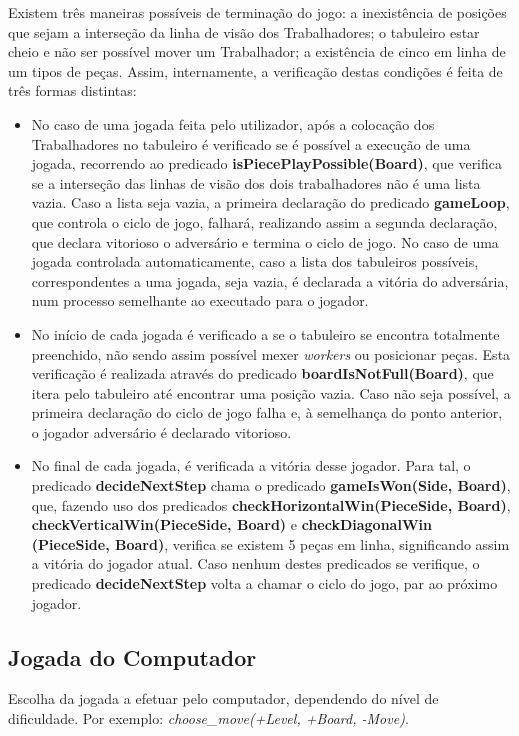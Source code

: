\documentclass[a4paper]{article}
\begin{document}
Existem três maneiras possíveis de terminação do jogo: a inexistência  de posições que sejam a interseção da linha de visão dos Trabalhadores; o tabuleiro estar cheio e não ser possível mover um Trabalhador; a existência de cinco em linha de um tipos de peças.
Assim, internamente, a verificação destas condições é feita de três formas distintas:
\begin{itemize}
	\item No caso de uma jogada feita pelo utilizador, após a colocação dos Trabalhadores no tabuleiro é verificado se é possível a execução de uma jogada, recorrendo ao predicado \textbf{isPiecePlayPossible(Board)}, que verifica se a interseção das linhas de visão dos dois trabalhadores não é uma lista vazia. Caso a lista seja vazia, a primeira declaração do predicado \textbf{gameLoop}, que controla o ciclo de jogo, falhará, realizando assim a segunda declaração, que declara vitorioso o adversário e termina o ciclo de jogo. No caso de uma jogada controlada automaticamente, caso a lista dos tabuleiros possíveis, correspondentes a uma jogada, seja vazia, é declarada a vitória do adversária, num processo semelhante ao executado para o jogador.
	\item No início de cada jogada é verificado a se o tabuleiro se encontra totalmente preenchido, não sendo assim possível mexer \textit{workers} ou posicionar peças. Esta verificação é realizada através do predicado \textbf{boardIsNotFull(Board)}, que itera pelo tabuleiro até encontrar uma posição vazia. Caso não seja possível, a primeira declaração do ciclo de jogo falha e, à semelhança do ponto anterior, o jogador adversário é declarado vitorioso.
	\item No final de cada jogada, é verificada a vitória desse jogador. Para tal, o predicado \textbf{decideNextStep} chama o predicado \textbf{gameIsWon(Side, Board)}, que, fazendo uso dos predicados \textbf{checkHorizontalWin(PieceSide, Board)}, \textbf{checkVerticalWin(PieceSide, Board)} e \textbf{checkDiagonalWin (PieceSide, Board)}, verifica se existem 5 peças em linha, significando assim a vitória do jogador atual. Caso nenhum destes predicados se verifique, o predicado \textbf{decideNextStep} volta a chamar o ciclo do jogo, par ao próximo jogador.
\end{itemize}

\newpage

\subsection{Jogada do Computador} Escolha da jogada a efetuar pelo computador, dependendo do nível de dificuldade. Por exemplo: \textit{choose\_move(+Level, +Board, -Move)}.
\end{document}
